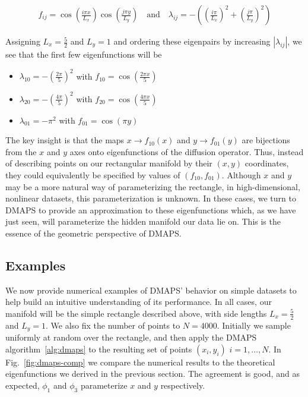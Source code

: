 \begin{align}
  f_{ij} = \cos\left(\frac{i \pi x}{L_x}\right) \cos\left(\frac{j \pi y}{L_y}\right) \quad
  \mathrm{and} \quad \lambda_{ij} = -\left( \left(\frac{i \pi
  }{L_x}\right)^2 + \left(\frac{j \pi}{L_y}\right)^2 \right)
\end{align}

Assigning $L_x = \frac{5}{2}$ and $L_y = 1$ and ordering these eigenpairs by
increasing $|\lambda_{ij}|$, we see that the first few eigenfunctions
will be

\begin{itemize}
\item $\lambda_{10} = -\left(\frac{2 \pi}{5}\right)^2$ with $f_{10} =
  \cos \left(\frac{2 \pi x}{5} \right)$
\item $\lambda_{20} = -\left(\frac{4 \pi}{5}\right)^2$ with $f_{20} =
  \cos \left(\frac{4 \pi x}{5} \right)$
\item $\lambda_{01} = -\pi^2$ with $f_{01} =
  \cos \left( \pi y \right)$
\end{itemize}

The key insight is that the maps $x \rightarrow f_{10} (x)$ and
$y \rightarrow f_{01} (y)$ are bijections from the $x$ and $y$ axes
onto eigenfunctions of the diffusion operator. Thus, instead of
describing points on our rectangular manifold by their $(x,y)$
coordinates, they could equivalently be specified by values of
$(f_{10}, f_{01})$. Although $x$ and $y$ may be a more natural way of
parameterizing the rectangle, in high-dimensional, nonlinear datasets,
this parameterization is unknown. In these cases, we turn to DMAPS to
provide an approximation to these eigenfunctions which, as we have
just seen, will parameterize the hidden manifold our data lie on. This
is the essence of the geometric perspective of DMAPS.

\subsection{Examples}

We now provide numerical examples of DMAPS' behavior on simple
datasets to help build an intuitive understanding of its
performance. In all cases, our manifold will be the simple rectangle
described above, with side lengths $L_x = \frac{5}{2}$ and $L_y =
1$. We also fix the number of points to $N = 4000$. Initially we
sample uniformly at random over the rectangle, and then apply the
DMAPS algorithm~\ref{alg:dmaps} to the resulting set of points
$(x_i, y_i)$ $i = 1, \dots, N$. In Fig.~\ref{fig:dmaps-comp} we
compare the numerical results to the theoretical eigenfunctions we
derived in the previous section. The agreement is good, and as
expected, $\phi_1$ and $\phi_3$ parameterize $x$ and $y$
respectively.

